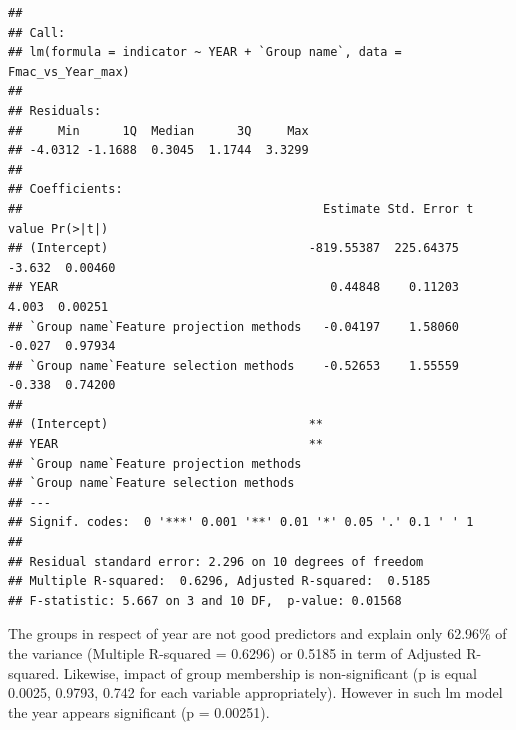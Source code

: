 \documentclass[
]{article}
\begin{document}
\begin{verbatim}
## 
## Call:
## lm(formula = indicator ~ YEAR + `Group name`, data = Fmac_vs_Year_max)
## 
## Residuals:
##     Min      1Q  Median      3Q     Max 
## -4.0312 -1.1688  0.3045  1.1744  3.3299 
## 
## Coefficients:
##                                          Estimate Std. Error t value Pr(>|t|)
## (Intercept)                            -819.55387  225.64375  -3.632  0.00460
## YEAR                                      0.44848    0.11203   4.003  0.00251
## `Group name`Feature projection methods   -0.04197    1.58060  -0.027  0.97934
## `Group name`Feature selection methods    -0.52653    1.55559  -0.338  0.74200
##                                          
## (Intercept)                            **
## YEAR                                   **
## `Group name`Feature projection methods   
## `Group name`Feature selection methods    
## ---
## Signif. codes:  0 '***' 0.001 '**' 0.01 '*' 0.05 '.' 0.1 ' ' 1
## 
## Residual standard error: 2.296 on 10 degrees of freedom
## Multiple R-squared:  0.6296, Adjusted R-squared:  0.5185 
## F-statistic: 5.667 on 3 and 10 DF,  p-value: 0.01568
\end{verbatim}

The groups in respect of year are not good predictors and explain only 62.96\% of the variance (Multiple R-squared = 0.6296) or 0.5185 in term of Adjusted R-squared. Likewise, impact of group membership is non-significant (p is equal 0.0025, 0.9793, 0.742 for each variable appropriately). However in such lm model the year appears significant (p = 0.00251).
\end{document}
